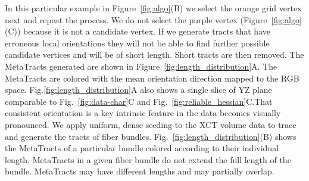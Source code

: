 In this particular example in Figure~\ref{fig:algo}(B) we select the orange grid vertex next and repeat the process. We do not select the purple vertex (Figure~\ref{fig:algo}(C)) because it is not a candidate vertex. If we generate tracts that have erroneous local orientations they will not be able to find further possible candidate vertices and will be of short length. Short tracts are then removed. The MetaTracts generated are shown in Figure~\ref{fig:length_distribution}A. The MetaTracts are colored with the mean orientation direction mapped to the RGB space. Fig.\ref{fig:length_distribution}A also shows a single slice of YZ plane comparable to Fig.~\ref{fig:data-char}C and Fig.~\ref{fig:reliable_hessian}C.That consistent orientation is a key intrinsic feature in the data becomes visually pronounced.
We apply uniform, dense seeding to the XCT volume data to trace and generate the tracts of fiber bundles. Fig.~\ref{fig:length_distribution}(B) shows the MetaTracts of a particular bundle colored according to their individual length.
MetaTracts in a given fiber bundle do not extend the full length of the bundle. MetaTracts may have different lengths and may partially overlap.
 
 
%
 

